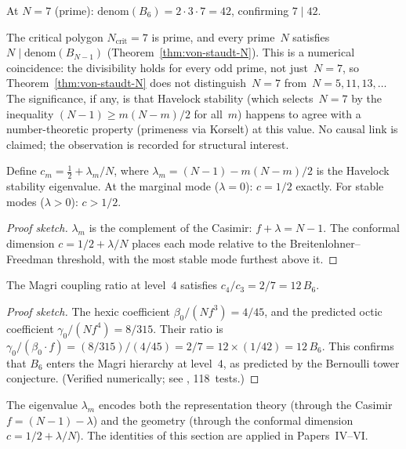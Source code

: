 At $N = 7$ (prime): $\mathrm{denom}(B_6) = 2 \cdot 3 \cdot 7 = 42$,
confirming $7 \mid 42$.

\begin{observation}
\label{obs:bernoulli-coincidence}
The critical polygon $N_{\mathrm{crit}} = 7$ is prime, and every
prime~$N$ satisfies $N \mid \mathrm{denom}(B_{N-1})$
(Theorem~\ref{thm:von-staudt-N}).  This is a numerical
coincidence: the divisibility holds for every odd prime, not
just~$N = 7$, so Theorem~\ref{thm:von-staudt-N} does not
distinguish~$N = 7$ from~$N = 5, 11, 13, \ldots$  The
significance, if any, is that Havelock stability
(which selects~$N = 7$ by the inequality $(N-1) \ge m(N-m)/2$
for all~$m$) happens to agree with a number-theoretic property
(primeness via Korselt) at this value.  No causal link is
claimed; the observation is recorded for structural interest.
\end{observation}

\begin{proposition}
\label{prop:unified-conformal}
Define $c_m = \tfrac{1}{2} + \lambda_m/N$,
where $\lambda_m = (N{-}1) - m(N{-}m)/2$ is the Havelock
stability eigenvalue.
At the marginal mode ($\lambda = 0$): $c = 1/2$ exactly.
For stable modes ($\lambda > 0$): $c > 1/2$.
\end{proposition}
\begin{proof}[Proof sketch]
$\lambda_m$ is the complement of the Casimir:
$f + \lambda = N{-}1$.
The conformal dimension $c = 1/2 + \lambda/N$
places each mode relative to the Breitenlohner--Freedman
threshold, with the most stable mode furthest above it.
\end{proof}

\begin{proposition}
\label{prop:magri-b6}
The Magri coupling ratio at level~$4$
satisfies $c_4/c_3 = 2/7 = 12\,B_6$.
\end{proposition}
\begin{proof}[Proof sketch]
The hexic coefficient
$\beta_0/(N f^3) = 4/45$,
and the predicted octic coefficient
$\gamma_0/(N f^4) = 8/315$.
Their ratio is
$\gamma_0/(\beta_0 \cdot f) = (8/315)/(4/45) = 2/7
= 12 \times (1/42) = 12\,B_6$.
This confirms that $B_6$ enters the Magri hierarchy
at level~$4$, as predicted by the Bernoulli tower conjecture.
(Verified numerically; see , 118~tests.)
\end{proof}

\begin{remark}
\label{rmk:unified-quantity}
The eigenvalue $\lambda_m$ encodes both the representation
theory (through the Casimir $f = (N{-}1) - \lambda$) and
the geometry (through the conformal dimension
$c = 1/2 + \lambda/N$).
The identities of this section are applied in Papers~IV--VI.
\end{remark}


